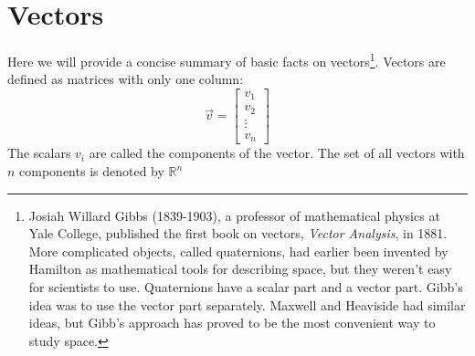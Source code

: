 \documentclass[10pt]{report}
\begin{document}
\chapter{Vectors}
Here we will provide a concise summary of basic facts on vectors\footnote{Josiah Willard Gibbs (1839-1903), a professor of mathematical physics at Yale College, published the first book on vectors, \textit{Vector Analysis}, in 1881. More complicated objects, called quaternions, had earlier been invented by Hamilton as mathematical tools for describing space, but they weren't easy for scientists to use. Quaternions have a scalar part and a vector part. Gibb's idea was to use the vector part separately. Maxwell and Heaviside had similar ideas, but Gibb's approach has proved to be the most convenient way to study space.}. Vectors are defined as matrices with only one column:
$$\vec{v}=\left[ \begin{array}{c}
v_1\\
v_2\\
\vdots\\
v_n
\end{array}\right]$$
The scalars $v_i$ are called the components of the vector. The set of all vectors with $n$ components is denoted by $\mathbb{R}^n$
\end{document}
